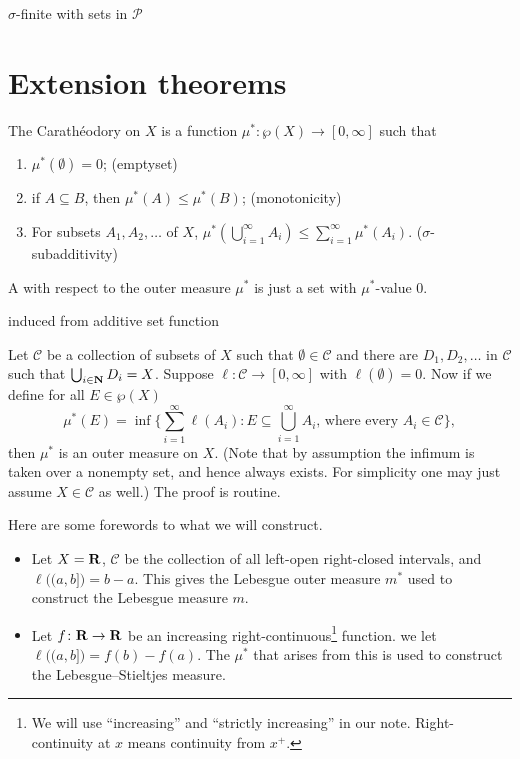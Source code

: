 $\sigma$-finite with sets in $\mathcal P$

\section{Extension theorems}
\begin{defn}
    The Carathéodory  on $X$ is a function $\mu^{*}\colon\wp(X)\to[0,\infty]$ such that 
    \begin{enumerate}
    \item $\mu^{*}(\emptyset)=0$; (emptyset)
    \item if $A\subseteq B$, then $\mu^{*}(A)\leq\mu^{*}(B)$; (monotonicity)
    \item For subsets $A_{1},A_{2},\dotsc$ of $X$, $\mu^{*}(\bigcup_{i=1}^{\infty}A_{i})\leq\sum_{i=1}^{\infty}\mu^{*}(A_{i})$. ($\sigma$-subadditivity)
    \end{enumerate}
    A  with respect to the outer measure $\mu^{*}$ is just a set with $\mu^{*}$-value 0.
\end{defn}

induced from additive set function

Let $\mathcal{C}$ be a collection of subsets of $X$ such that $\emptyset\in\mathcal{C}$ and there are $D_{1},D_{2},\dotsc$ in $\mathcal{C}$ such that $\bigcup_{i\in\mathbf{N}}D_{i}=X$. Suppose $\ell\colon\mathcal{C}\to[0,\infty]$ with $\ell(\emptyset)=0$. Now if we define for all $E\in \wp(X)$ 
\[
    \mu^{*}(E)=\inf\biggl\{\sum_{i=1}^{\infty}\ell(A_{i}):E\subseteq\bigcup_{i=1}^{\infty}A_{i}\text{, where every }A_{i}\in\mathcal{C}\biggr\},
\]
then $\mu^{*}$ is an outer measure on $X$. (Note that by assumption
the infimum is taken over a nonempty set, and hence always exists. For simplicity one may just assume $X \in \mathcal{C}$ as well.)
The proof is routine.

    Here are some forewords to what we will construct.
\begin{itemize}
\item Let $X=\mathbf{R}$, $\mathcal{C}$ be the collection of all left-open right-closed
intervals, and $\ell\bigl((a,b]\bigr)=b-a$. This gives the Lebesgue
outer measure $m^{*}$ used to construct the Lebesgue measure $m$.
\item Let $f\colon\mathbf{R}\to\mathbf{R}$ be an increasing right-continuous\footnote{We will use ``increasing'' and ``strictly increasing'' in our note. Right-continuity at $x$ means continuity from $x^{+}$.}
function. we let $\ell\bigl((a,b]\bigr)=f(b)-f(a)$. The $\mu^{*}$
that arises from this is used to construct the Lebesgue--Stieltjes measure.
\end{itemize}

